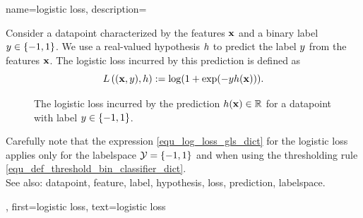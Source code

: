 {name={logistic loss}, 
	description={Consider 
		a \gls{datapoint} characterized by the \glspl{feature} ${\bf x}$ and a binary \gls{label} $y \in \{-1,1\}$. 
		We use a real-valued \gls{hypothesis} $h$ to predict the \gls{label} $y$ 
		from the \glspl{feature} ${\bf x}$. The logistic \gls{loss} incurred by this \gls{prediction} is 
		defined as 
	\begin{equation} 
		\label{equ_log_loss_gls_dict}
		L\left(({\bf x},y),h \right) :=  \log ( 1 + \exp(- y h({\bf x}))).
	\end{equation}
	\begin{figure}[H]
	\begin{center}
		\caption{The logistic \gls{loss} incurred by the \gls{prediction} $h({\bf x}) \in \mathbb{R}$ 
			for a \gls{datapoint} with \gls{label} $y \in \{-1,1\}$.}
		\label{fig_logloss_dict}
	\end{center}
	\end{figure}
	Carefully note that the expression \eqref{equ_log_loss_gls_dict} 
	for the logistic \gls{loss} applies only for the \gls{labelspace} $\mathcal{Y} = \{ -1,1\}$ and when using 
	the thresholding rule \eqref{equ_def_threshold_bin_classifier_dict}. 
		\\
		See also: \gls{datapoint}, \gls{feature}, \gls{label}, \gls{hypothesis}, \gls{loss}, \gls{prediction}, \gls{labelspace}.},
		first={logistic loss},
		text={logistic loss}
}
	

